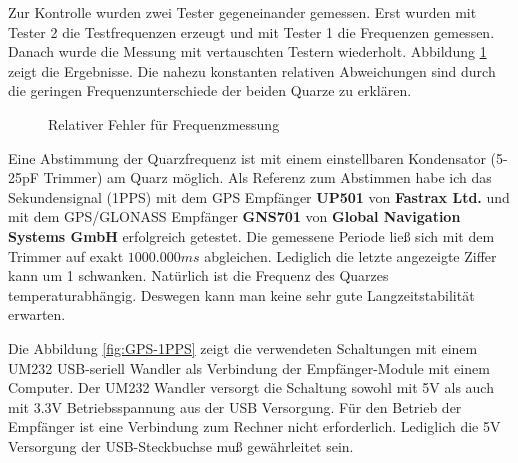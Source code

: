 Zur Kontrolle wurden zwei Tester gegeneinander gemessen.
Erst wurden mit Tester 2 die Testfrequenzen erzeugt und mit Tester 1 die Frequenzen gemessen.
Danach wurde die Messung mit vertauschten Testern wiederholt.
Abbildung \ref{fig:freq-ppm} zeigt die Ergebnisse.
Die nahezu konstanten relativen Abweichungen sind durch die geringen Frequenzunterschiede der beiden Quarze zu erklären.

\begin{figure}[H]
\centering

\caption{Relativer Fehler für Frequenzmessung }
\label{fig:freq-ppm}
\end{figure}

Eine Abstimmung der Quarzfrequenz ist mit einem einstellbaren Kondensator (5-25pF Trimmer) am Quarz möglich.
Als Referenz zum Abstimmen habe ich das Sekundensignal (1PPS) mit dem GPS Empfänger {\bf UP501} von {\bf Fastrax Ltd.} und
mit dem GPS/GLONASS Empfänger {\bf GNS701} von {\bf Global Navigation Systems GmbH} erfolgreich getestet.
Die gemessene Periode ließ sich mit dem Trimmer auf exakt \(1000.000 ms\) abgleichen.
Lediglich die letzte angezeigte Ziffer kann um 1 schwanken.
Natürlich ist die Frequenz des Quarzes temperaturabhängig.
Deswegen kann man keine sehr gute Langzeitstabilität erwarten.

Die Abbildung \ref{fig:GPS-1PPS} zeigt die verwendeten Schaltungen mit einem
UM232 USB-seriell Wandler als Verbindung der Empfänger-Module mit einem Computer.
Der UM232 Wandler versorgt die Schaltung sowohl mit 5V als auch mit 3.3V Betriebsspannung
aus der USB Versorgung.
Für den Betrieb der Empfänger ist eine Verbindung zum Rechner nicht erforderlich.
Lediglich die 5V Versorgung der USB-Steckbuchse muß gewährleitet sein.

